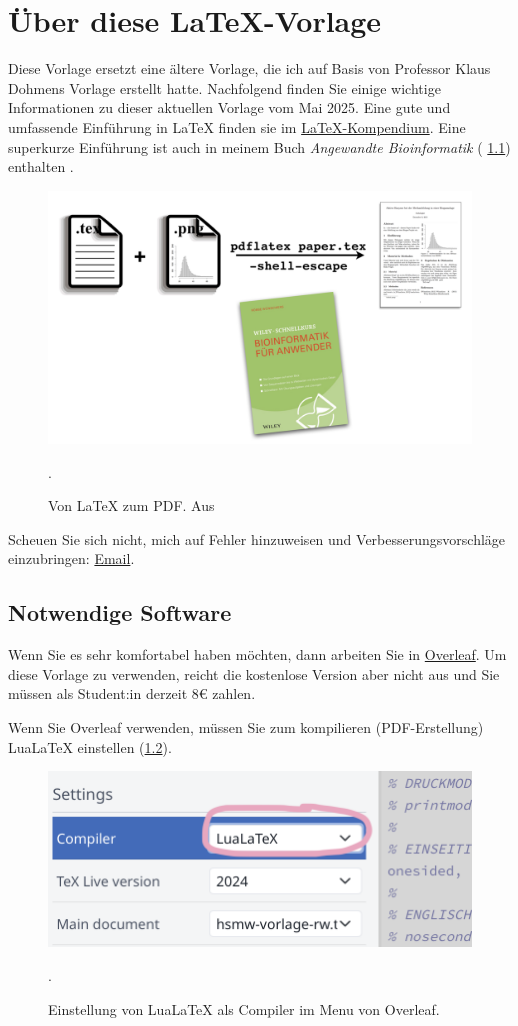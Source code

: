 \chapter{Über diese \LaTeX{}-Vorlage}
Diese Vorlage ersetzt eine ältere Vorlage, die ich auf Basis von Professor Klaus Dohmens Vorlage erstellt hatte. Nachfolgend finden Sie einige wichtige Informationen zu dieser aktuellen Vorlage vom Mai 2025. Eine gute und umfassende Einführung in \LaTeX{} finden sie im \href{https://de.wikibooks.org/wiki/LaTeX-Kompendium}{LaTeX-Kompendium}. Eine superkurze Einführung ist auch in meinem Buch \textit{Angewandte Bioinformatik} ( \cref{fig:latex}) enthalten \citep{Wuenschiers2016kap12}.

\begin{figure}[h]
    \centering
    \includegraphics[width=.7\columnwidth]{fig-latex.png}
    \caption{Von \LaTeX{} zum PDF. Aus \citep{Wuenschiers2016}}.
    \label{fig:latex}
\end{figure}

Scheuen Sie sich nicht, mich auf Fehler hinzuweisen und Verbesserungsvorschläge einzubringen: \href{mailto:rw@biowasserstoff.de?subject=HSMW LaTeX-Vorlage}{Email}.


\section{Notwendige Software}
Wenn Sie es sehr komfortabel haben möchten, dann arbeiten Sie in \href{https://www.overleaf.com}{Overleaf}. Um diese Vorlage zu verwenden, reicht die kostenlose Version aber nicht aus und Sie müssen als Student:in derzeit 8€ zahlen.

Wenn Sie Overleaf verwenden, müssen Sie zum kompilieren (PDF-Erstellung) LuaLaTeX einstellen (\cref{fig:overleaf}).

\begin{figure}[h]
\centering
\includegraphics[width=.5\columnwidth]{overleaf.png}
\caption{Einstellung von LuaLaTeX als Compiler im Menu von Overleaf.}.
\label{fig:overleaf}
\end{figure}

